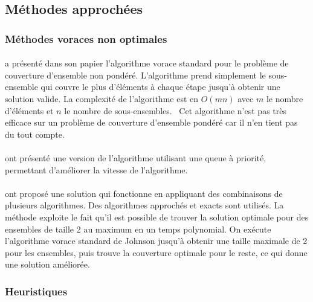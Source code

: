 \documentclass[12pt,letterpaper,twoside]{article}
\begin{document}
		\subsection{Méthodes approchées}
			\subsubsection{Méthodes voraces non optimales}\label{sec:soa-greedy}
				\paragraph*{}
					\citeauthor{Johnson:1973:AAC:800125.804034} a présenté dans son papier 
					l'algorithme vorace standard pour le problème de couverture d'ensemble non pondéré.
					L'algorithme prend simplement le sous-ensemble qui couvre le plus
					d'éléments à chaque étape jusqu'à obtenir une solution valide. La complexité de l'algorithme est en \(O(mn)\) avec \(m\)
					le nombre d'éléments et \(n\) le nombre de sous-ensembles.~\cite{Johnson:1973:AAC:800125.804034}
					Cet algorithme n'est pas très efficace sur un problème de couverture d'ensemble pondéré car il n'en tient pas du
					tout compte.
				\paragraph*{}
					\citeauthor{Cormen:2009:IAT:1614191} ont présenté une version de l'algorithme utilisant une queue à priorité,
					permettant d'améliorer la vitesse de l'algorithme.~\cite{Cormen:2009:IAT:1614191}
				\paragraph*{}
					\citeauthor{Goldschmidt:1993:MGH:177276.177287} ont proposé une solution qui fonctionne en appliquant des
					combinaisons de plusieurs algorithmes. Des algorithmes approchés et exacts sont utilisés.
					La méthode exploite le fait qu'il est possible de trouver la solution optimale pour des ensembles de taille 2 au maximum
					en un temps polynomial. On exécute l'algorithme vorace standard de Johnson jusqu'à obtenir une taille maximale de 2 pour les
					ensembles, puis trouve la couverture optimale pour le reste, ce qui donne une solution améliorée.~\cite{Goldschmidt:1993:MGH:177276.177287}
			\subsubsection{Heuristiques}
\end{document}
